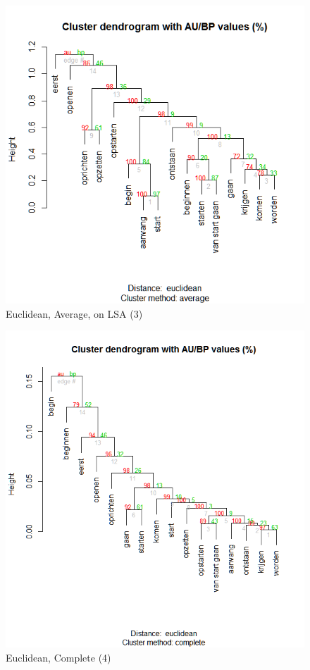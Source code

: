 \begin{figure}
\includegraphics[height=.3\textheight]{figures/Vandevoorde2-img32.png}
\caption{\label{fig:key:32}  Euclidean, Average, on LSA (3)}
\end{figure}

\begin{figure}
\includegraphics[height=.3\textheight]{figures/Vandevoorde2-img33.png}
\caption{\label{fig:key:33}  Euclidean, Complete (4)}
\end{figure}

